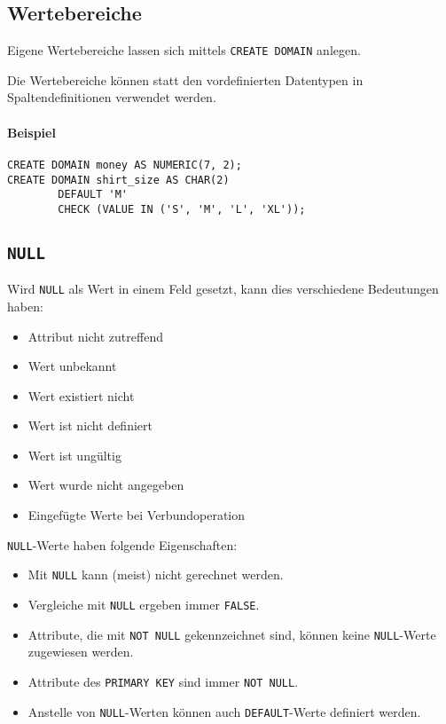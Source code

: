         \subsection{Wertebereiche} %
            Eigene Wertebereiche lassen sich mittels \lstinline|CREATE DOMAIN| anlegen.
            
            Die Wertebereiche können statt den vordefinierten Datentypen in Spaltendefinitionen verwendet werden.
            
            \paragraph{Beispiel}
            	\begin{lstlisting}
CREATE DOMAIN money AS NUMERIC(7, 2);
CREATE DOMAIN shirt_size AS CHAR(2)
		DEFAULT 'M'
		CHECK (VALUE IN ('S', 'M', 'L', 'XL'));
            	\end{lstlisting}

        \subsection{\lstinline|NULL|} %
        	Wird \lstinline|NULL| als Wert in einem Feld gesetzt, kann dies verschiedene Bedeutungen haben:
        	\begin{itemize}
        		\item Attribut nicht zutreffend
        		\item Wert unbekannt
        		\item Wert existiert nicht
        		\item Wert ist nicht definiert
        		\item Wert ist ungültig
        		\item Wert wurde nicht angegeben
        		\item Eingefügte Werte bei Verbundoperation
        	\end{itemize}
        	
        	\lstinline|NULL|-Werte haben folgende Eigenschaften:
        	\begin{itemize}
        		\item Mit \lstinline|NULL| kann (meist) nicht gerechnet werden.
        		\item Vergleiche mit \lstinline|NULL| ergeben immer \lstinline|FALSE|.
        		\item Attribute, die mit \lstinline|NOT NULL| gekennzeichnet sind, können keine \lstinline|NULL|-Werte zugewiesen werden.
        		\item Attribute des \lstinline|PRIMARY KEY| sind immer \lstinline|NOT NULL|.
        		\item Anstelle von \lstinline|NULL|-Werten können auch \lstinline|DEFAULT|-Werte definiert werden.
        	\end{itemize}

